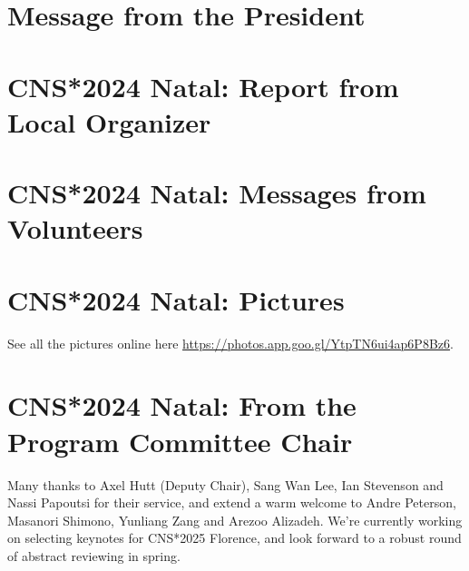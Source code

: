 \documentclass[11pt,a4paper,oneside]{article}
\begin{document}

\newpage

\pagestyle{fancy}
\fancyhead{}
\fancyfoot{}

\newpage
\section*{Message from the President}%

\lipsum[1-3]

\newpage
\section*{CNS*2024 Natal: Report from Local Organizer}%
\lipsum[1-3]

\newpage
\section*{CNS*2024 Natal: Messages from Volunteers}%
\lipsum[1-3]

\newpage
\section*{CNS*2024 Natal: Pictures}%
\sectionauthor{  }
See all the pictures online here \url{https://photos.app.goo.gl/YtpTN6ui4ap6P8Bz6}.

\newpage
\section*{CNS*2024 Natal: From the Program Committee Chair}%
Many thanks to Axel Hutt (Deputy Chair), Sang Wan Lee, Ian Stevenson and Nassi Papoutsi for their service, and extend a warm welcome to Andre Peterson, Masanori Shimono, Yunliang Zang and Arezoo Alizadeh.
We're currently working on selecting keynotes for CNS*2025 Florence, and look forward to a robust round of abstract reviewing in spring.

\newpage


\newpage
\end{document}
